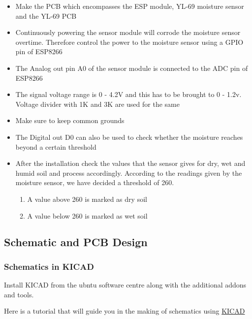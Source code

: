 \documentclass[16pt]{article}
\begin{document}
\begin{itemize}

\item
  Make the PCB which encompasses the ESP module, YL-69 moisture sensor
  and the YL-69 PCB
\item
  Continuously powering the sensor module will corrode the moisture
  sensor overtime. Therefore control the power to the moisture sensor
  using a GPIO pin of ESP8266
\item
  The Analog out pin A0 of the sensor module is connected to the ADC pin
  of ESP8266
\item
  The signal voltage range is 0 - 4.2V and this has to be brought to 0 -
  1.2v. Voltage divider with 1K and 3K are used for the same
\item
  Make sure to keep common grounds
\item
  The Digital out D0 can also be used to check whether the moisture
  reaches beyond a certain threshold
\item
  After the installation check the values that the sensor gives for dry,
  wet and humid soil and process accordingly. According to the readings given by the 
  moisture sensor, we have decided a threshold of 260. 
\begin{enumerate}
 \item A value above 260 is marked as dry soil
 \item A value below 260 is marked as wet soil 
\end{enumerate}


  
\end{itemize}

\vspace{0.5cm}

\subsection{Schematic and PCB
Design}



\subsubsection{Schematics in KICAD}
Install KICAD from the ubntu software centre along with the additional
addons and tools.

Here is a tutorial that will guide you in the making of schematics using
{\color{red}\href{https://www.youtube.com/watch?v=rkQ0nVX1q1k}{KICAD}}
\end{document}
